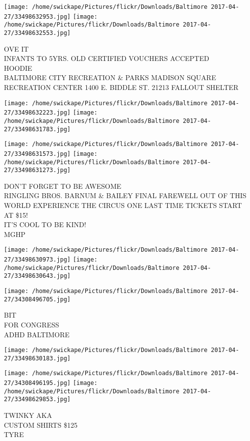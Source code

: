 \documentclass[10pt,letterpaper]{article}
\begin{document}
\texttt{[image: /home/swickape/Pictures/flickr/Downloads/Baltimore 2017-04-27/33498632953.jpg]}
\texttt{[image: /home/swickape/Pictures/flickr/Downloads/Baltimore 2017-04-27/33498632553.jpg]}

OVE IT\\
INFANTS TO 5YRS. OLD CERTIFIED VOUCHERS ACCEPTED\\
HOODIE\\
BALTIMORE CITY RECREATION \& PARKS MADISON SQUARE RECREATION CENTER 1400 E. BIDDLE ST. 21213 FALLOUT SHELTER
\pagebreak

\texttt{[image: /home/swickape/Pictures/flickr/Downloads/Baltimore 2017-04-27/33498632223.jpg]}
\texttt{[image: /home/swickape/Pictures/flickr/Downloads/Baltimore 2017-04-27/33498631783.jpg]}

\texttt{[image: /home/swickape/Pictures/flickr/Downloads/Baltimore 2017-04-27/33498631573.jpg]}
\texttt{[image: /home/swickape/Pictures/flickr/Downloads/Baltimore 2017-04-27/33498631273.jpg]}

DON'T FORGET TO BE AWESOME\\
RINGLING BROS. BARNUM \& BAILEY FINAL FAREWELL OUT OF THIS WORLD EXPERIENCE THE CIRCUS ONE LAST TIME TICKETS START AT \$15!\\
IT'S COOL TO BE KIND!\\
MGHP
\pagebreak

\texttt{[image: /home/swickape/Pictures/flickr/Downloads/Baltimore 2017-04-27/33498630973.jpg]}
\texttt{[image: /home/swickape/Pictures/flickr/Downloads/Baltimore 2017-04-27/33498630643.jpg]}

\texttt{[image: /home/swickape/Pictures/flickr/Downloads/Baltimore 2017-04-27/34308496705.jpg]}

BIT\\
FOR CONGRESS\\
ADHD BALTIMORE
\pagebreak

\texttt{[image: /home/swickape/Pictures/flickr/Downloads/Baltimore 2017-04-27/33498630183.jpg]}

\vspace{0.25in}
\texttt{[image: /home/swickape/Pictures/flickr/Downloads/Baltimore 2017-04-27/34308496195.jpg]}
\texttt{[image: /home/swickape/Pictures/flickr/Downloads/Baltimore 2017-04-27/33498629853.jpg]}

TWINKY AKA\\
CUSTOM SHIRTS \$125\\
TYRE
\pagebreak
\end{document}
